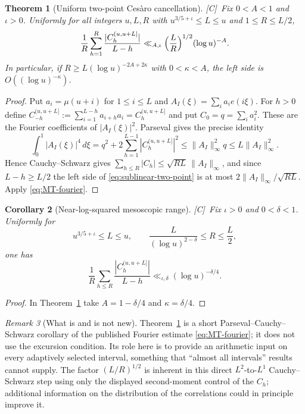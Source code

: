 \documentclass[11pt]{amsart}
\numberwithin{equation}{section}
\theoremstyle{plain}
\newtheorem{theorem}{Theorem}[section]
\newtheorem{corollary}[theorem]{Corollary}
\theoremstyle{definition}
\theoremstyle{remark}
\newtheorem{remark}[theorem]{Remark}
\newcommand{\tagC}{\textup{[C]}}
\begin{document}
\begin{theorem}[Uniform two-point Ces\`aro cancellation]
\label{thm:sublinear-two-point}
\tagC\ Fix $0<A<1$ and $\iota>0$. Uniformly for all integers $u,L,R$ with
$u^{3/5+\iota}\le L\le u$ and $1\le R\le L/2$,
\begin{equation}
\label{eq:sublinear-two-point}
\frac1R\sum_{h=1}^{R}\frac{|C^{(u,u+L]}_h|}{L-h}
\ll_{A,\iota}\Bigl(\frac LR\Bigr)^{1/2}(\log u)^{-A}.
\end{equation}
In particular, if $R\ge L(\log u)^{-2A+2\kappa}$ with
$0<\kappa<A$, the left side is $O((\log u)^{-\kappa})$.
\end{theorem}

\begin{proof}
Put $a_i=\mu(u+i)$ for $1\le i\le L$ and
$A_I(\xi)=\sum_ia_ie(i\xi)$. For $h>0$ define
$C_{-h}^{(u,u+L]}:=\sum_{i=1}^{L-h}a_{i+h}a_i=C_h^{(u,u+L]}$ and put
$C_0=q=\sum_i a_i^2$.  These are the Fourier coefficients of
$|A_I(\xi)|^2$.  Parseval gives the precise identity
\[
\int_0^1|A_I(\xi)|^4\,d\xi
=q^2+2\sum_{h=1}^{L-1}|C_h^{(u,u+L]}|^2
\le\|A_I\|_\infty^2q
\le L\|A_I\|_\infty^2.
\]
Hence Cauchy--Schwarz gives
$\sum_{h\le R}|C_h|\le\sqrt{RL}\,\|A_I\|_\infty$, and since
$L-h\ge L/2$ the left side of \eqref{eq:sublinear-two-point} is at most
$2\|A_I\|_\infty/\sqrt{RL}$. Apply \eqref{eq:MT-fourier}.
\end{proof}

\begin{corollary}[Near-log-squared mesoscopic range]
\label{cor:near-log2-lags}
\tagC\ Fix $\iota>0$ and $0<\delta<1$. Uniformly for
\[
u^{3/5+\iota}\le L\le u,
\qquad
\frac{L}{(\log u)^{2-\delta}}\le R\le\frac L2,
\]
one has
\[
\frac1R\sum_{h\le R}\frac{|C^{(u,u+L]}_h|}{L-h}
\ll_{\iota,\delta}(\log u)^{-\delta/4}.
\]
\end{corollary}

\begin{proof}
In Theorem~\ref{thm:sublinear-two-point} take
$A=1-\delta/4$ and $\kappa=\delta/4$.
\end{proof}

\begin{remark}[What is and is not new]
\label{rem:sublinear-status}
Theorem~\ref{thm:sublinear-two-point} is a short Parseval--Cauchy--Schwarz
corollary of the published Fourier estimate \eqref{eq:MT-fourier}; it does
not use the excursion condition. Its role here is to provide an arithmetic
input on every adaptively selected interval, something that ``almost all
intervals'' results cannot supply. The factor $(L/R)^{1/2}$ is inherent in
this direct $L^2$-to-$L^1$ Cauchy--Schwarz step using only the displayed
second-moment control of the $C_h$; additional information on the
distribution of the correlations could in principle improve it.
\end{remark}
\end{document}
